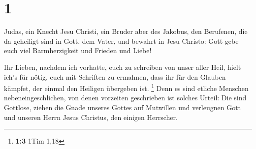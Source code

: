 \hypertarget{section}{%
\section{1}\label{section}}

 Judas, ein Knecht Jesu Christi, ein Bruder aber des
Jakobus, den Berufenen, die da geheiligt sind in Gott, dem Vater, und
bewahrt in Jesu Christo:  Gott gebe euch viel Barmherzigkeit
und Frieden und Liebe!

 Ihr Lieben, nachdem ich vorhatte, euch zu schreiben von
unser aller Heil, hielt ich's für nötig, euch mit Schriften zu ermahnen,
dass ihr für den Glauben kämpfet, der einmal den Heiligen übergeben ist.
\footnote{\textbf{1:3} 1Tim 1,18}  Denn es sind etliche
Menschen nebeneingeschlichen, von denen vorzeiten geschrieben ist
solches Urteil: Die sind Gottlose, ziehen die Gnade unseres Gottes auf
Mutwillen und verleugnen Gott und unseren Herrn Jesus Christus, den
einigen Herrscher.

